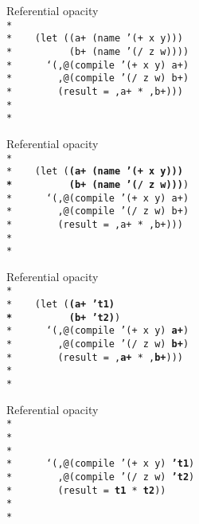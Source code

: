 \begin{frame}{Referential opacity}
  \texttt{
    \ \\*
    \ \\*
    \ \ \ (let ((a+ (name '(+ x y)))\\*
    \ \ \ \ \ \ \ \ \ (b+ (name '(/ z w))))\\*
    \ \ \ \ \ `(,@(compile '(+ x y) a+)\\*
    \ \ \ \ \ \ \ ,@(compile '(/ z w) b+)\\*
    \ \ \ \ \ \ \ (result = ,a+ * ,b+))) \\*
    \ \\*
    \ 
  }
\end{frame}

\begin{frame}{Referential opacity}
  \texttt{
    \ \\*
    \ \\*
    \ \ \ (let (\textbf{(a+ (name '(+ x y))) \\*
      \ \ \ \ \ \ \ \ \ (b+ (name '(/ z w)))})\\*
    \ \ \ \ \ `(,@(compile '(+ x y) a+)\\*
    \ \ \ \ \ \ \ ,@(compile '(/ z w) b+)\\*
    \ \ \ \ \ \ \ (result = ,a+ * ,b+))) \\*
    \ \\*
    \ 
  }
\end{frame}

\begin{frame}{Referential opacity}
  \texttt{
    \ \\*
    \ \\*
    \ \ \ (let (\textbf{(a+ 't1)\\*
      \ \ \ \ \ \ \ \ \  (b+ 't2)})\\*
    \ \ \ \ \ `(,@(compile '(+ x y) \textbf{a+})\\*
    \ \ \ \ \ \ \ ,@(compile '(/ z w) \textbf{b+})\\*
    \ \ \ \ \ \ \ (result = ,\textbf{a+} * ,\textbf{b+}))) \\*
    \ \\*
    \ 
  }
\end{frame}

\begin{frame}{Referential opacity}
  \texttt{
    \ \\*
    \ \\*
    \ \\*
    \ \\*
    \ \ \ \ \ `(,@(compile '(+ x y) \textbf{'t1})\\*
    \ \ \ \ \ \ \ ,@(compile '(/ z w) \textbf{'t2})\\*
    \ \ \ \ \ \ \ (result = \textbf{t1} * \textbf{t2})) \\*
    \ \\*
    \ 
  }
\end{frame}


